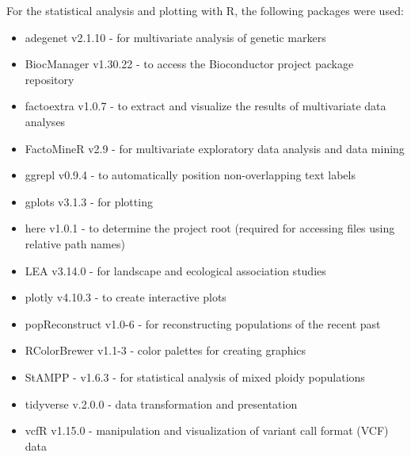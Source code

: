 For the statistical analysis and plotting with R, the following packages were used:
\begin{itemize}
    \item adegenet v2.1.10 - for multivariate analysis of genetic markers
    \item BiocManager v1.30.22 - to access the Bioconductor project package repository
    \item factoextra v1.0.7 - to extract and visualize the results of multivariate data analyses
    \item FactoMineR v2.9 - for multivariate exploratory data analysis and data mining
    \item ggrepl v0.9.4 - to automatically position non-overlapping text labels
    \item gplots v3.1.3 - for plotting
    \item here v1.0.1 - to determine the project root (required for accessing files using relative path names)
    \item LEA v3.14.0 - for landscape and ecological association studies
    \item plotly v4.10.3 - to create interactive plots
    \item popReconstruct v1.0-6 - for reconstructing populations of the recent past
    \item RColorBrewer v1.1-3 - color palettes for creating graphics
    \item StAMPP - v1.6.3 - for statistical analysis of mixed ploidy populations
    \item tidyverse v.2.0.0 - data transformation and presentation
    \item vcfR v1.15.0 - manipulation and visualization of variant call format (VCF) data
\end{itemize}
